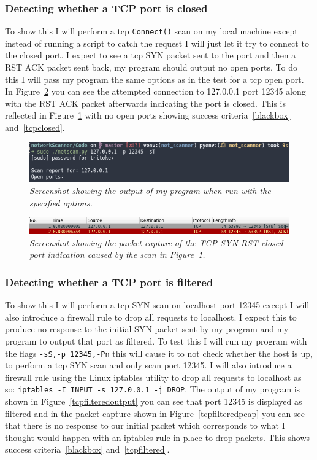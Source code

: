 \documentclass[titlepage]{article}
\let\Oldsubsubsection\subsubsection{}
\renewcommand{\subsubsection}{\FloatBarrier\Oldsubsubsection}
\begin{document}
\subsubsection{Detecting whether a TCP port is closed}
To show this I will perform a \gls{tcp} \verb|Connect()| scan
on my local machine except instead of running a script to catch the
request I will just let it try to connect to the closed port.
I expect to see a \gls{tcp} SYN packet sent to the port and then a RST ACK
packet sent back, my program should output no open ports.
To do this I will pass my program the same options as in the test for
a \gls{tcp} open port.
In Figure~\ref{tcpclosedpcap} you can see the attempted connection to
127.0.0.1 port 12345 along with the RST ACK packet afterwards indicating
the port is closed. This is reflected in Figure~\ref{tcpclosedoutput}
with no open ports showing success criteria~\ref{blackbox} and~\ref{tcpclosed}.
\begin{figure}[H]
  \centering
  \includegraphics[width=\textwidth]{tcpclosedoutput.png}
  \caption{\textit{%
    Screenshot showing the output of my program when run with the specified options.
}}\label{tcpclosedoutput}
\end{figure}

\begin{figure}[H]
  \centering
  \includegraphics[width=\textwidth]{tcpclosedpcap.png}
  \caption{\textit{%
    Screenshot showing the packet capture of the TCP SYN-RST closed port indication
    caused by the scan in Figure~\ref{tcpclosedoutput}.
}}\label{tcpclosedpcap}
\end{figure}

\subsubsection{Detecting whether a TCP port is filtered}
To show this I will perform a \gls{tcp} SYN scan on localhost port 12345
except I will also introduce a firewall rule to drop all requests to localhost.
I expect this to produce no response to the initial SYN packet sent by my
program and my program to output that port as filtered. To test this I will
run my program with the flags \verb|-sS,-p 12345,-Pn| this will cause it to not
check whether the host is up, to perform a \gls{tcp} SYN scan and only scan port 12345.
I will also introduce a firewall rule using the Linux iptables utility to drop
all requests to localhost as so: \verb|iptables -I INPUT -s 127.0.0.1 -j DROP|.
The output of my program is shown in Figure~\ref{tcpfilteredoutput} you can
see that port 12345 is displayed as filtered and in the packet capture shown in
Figure~\ref{tcpfilteredpcap} you can see that there is no response to our initial packet
which corresponds to what I thought would happen with an iptables rule in place
to drop packets. This shows success criteria~\ref{blackbox} and~\ref{tcpfiltered}.
\end{document}
